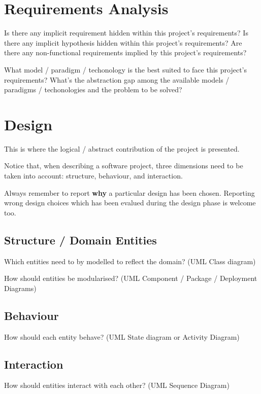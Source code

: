 \documentclass{scrartcl}
\begin{document}
\section{Requirements Analysis}

Is there any implicit requirement hidden within this project's requirements?
%
Is there any implicit hypothesis hidden within this project's requirements?
%
Are there any non-functional requirements implied by this project's requirements?

What model / paradigm / techonology is the best suited to face this project's requirements?
%
What's the abstraction gap among the available models / paradigms / techonologies and the problem to be solved?

\section{Design}

This is where the logical / abstract contribution of the project is presented.

Notice that, when describing a software project, three dimensions need to be taken into account: structure, behaviour, and interaction.

Always remember to report \textbf{why} a particular design has been chosen.
Reporting wrong design choices which has been evalued during the design phase is welcome too.

\subsection{Structure / Domain Entities}

Which entities need to by modelled to reflect the domain?
%
(UML Class diagram)

How should entities be modularised?
%
(UML Component / Package / Deployment Diagrams)

\subsection{Behaviour}

How should each entity behave?
%
(UML State diagram or Activity Diagram)

\subsection{Interaction}

How should entities interact with each other?
%
(UML Sequence Diagram)
\end{document}

